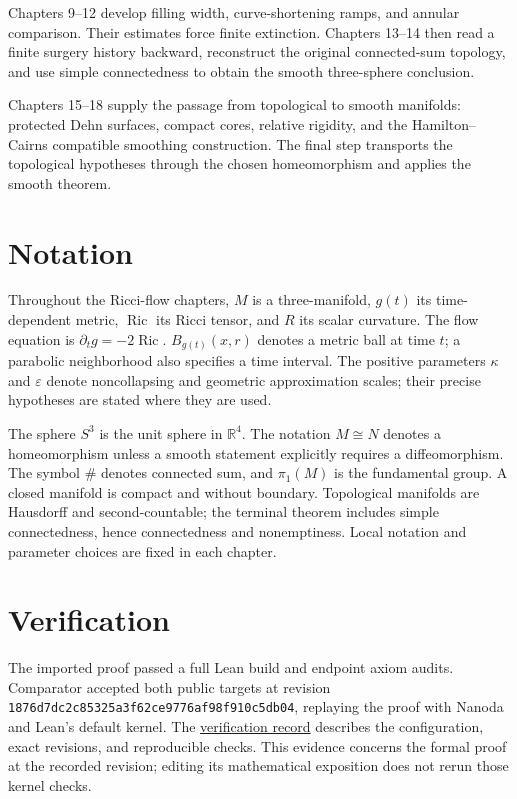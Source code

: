 Chapters 9--12 develop filling width, curve-shortening ramps, and annular
comparison. Their estimates force finite extinction. Chapters 13--14 then
read a finite surgery history backward, reconstruct the original
connected-sum topology, and use simple connectedness to obtain the smooth
three-sphere conclusion.

Chapters 15--18 supply the passage from topological to smooth manifolds:
protected Dehn surfaces, compact cores, relative rigidity, and the
Hamilton--Cairns compatible smoothing construction. The final step transports
the topological hypotheses through the chosen homeomorphism and applies the
smooth theorem.

\section*{Notation}

Throughout the Ricci-flow chapters, $M$ is a three-manifold, $g(t)$ its
time-dependent metric, $\operatorname{Ric}$ its Ricci tensor, and $R$ its
scalar curvature. The flow equation is
$\partial_t g=-2\operatorname{Ric}$.
$B_{g(t)}(x,r)$ denotes a metric ball at time $t$; a parabolic neighborhood
also specifies a time interval. The positive parameters $\kappa$ and
$\varepsilon$ denote noncollapsing and geometric approximation scales;
their precise hypotheses are stated where they are used.

The sphere $S^3$ is the unit sphere in $\mathbb R^4$.
The notation $M\cong N$ denotes a homeomorphism unless a smooth statement
explicitly requires a diffeomorphism. The symbol $\#$ denotes connected sum,
and $\pi_1(M)$ is the fundamental group. A closed manifold is compact and
without boundary. Topological manifolds are Hausdorff and second-countable;
the terminal theorem includes simple connectedness, hence connectedness and
nonemptiness. Local notation and parameter choices are fixed in each chapter.

\section*{Verification}

The imported proof passed a full Lean build and endpoint axiom audits.
Comparator accepted both public targets at revision
\texttt{1876d7dc2c85325a3f62ce9776af98f910c5db04}, replaying the proof
with Nanoda and Lean's default kernel. The
\href{https://github.com/frenzymath/Poincare-Conjecture/blob/main/site/verification.md}{verification record}
describes the configuration, exact revisions, and reproducible checks.
This evidence concerns the formal proof at the recorded revision;
editing its mathematical exposition does not rerun those kernel checks.




















